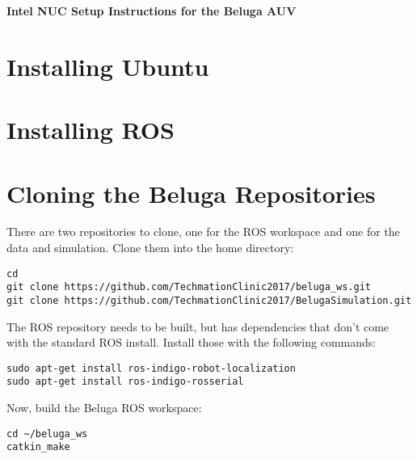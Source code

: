 \documentclass{article}
\begin{document}
\begin{center}
\Large\bf Intel NUC Setup Instructions for the Beluga AUV
\end{center}

\section*{Installing Ubuntu}

\section*{Installing ROS}

\section*{Cloning the Beluga Repositories}
There are two repositories to clone, one for the ROS workspace and one for the data and simulation.
Clone them into the home directory:

\begin{verbatim}
cd
git clone https://github.com/TechmationClinic2017/beluga_ws.git
git clone https://github.com/TechmationClinic2017/BelugaSimulation.git
\end{verbatim}

The ROS repository needs to be built, but has dependencies that don't come with the standard ROS install.
Install those with the following commands:

\begin{verbatim}
sudo apt-get install ros-indigo-robot-localization
sudo apt-get install ros-indigo-rosserial
\end{verbatim}

Now, build the Beluga ROS workspace:

\begin{verbatim}
cd ~/beluga_ws
catkin_make
\end{verbatim}
\end{document}
